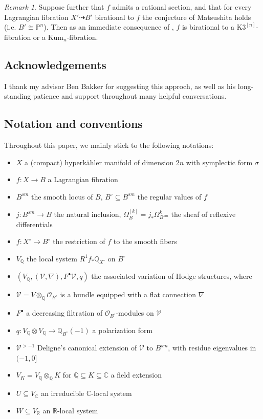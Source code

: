 \documentclass[12pt]{amsart}
\newcommand{\R}{\mathbb{R}}
\newcommand{\Q}{\mathbb{Q}}
\newcommand{\C}{\mathbb{C}}
\theoremstyle{definition}
\theoremstyle{remark}
\newtheorem{remark}[theorem]{Remark}
\numberwithin{equation}{section}
\begin{document}
\begin{remark}
Suppose further that \(f\) admits a rational section, and that for
every Lagrangian fibration \(X' \dashrightarrow B'\) birational to \(f\)
the conjecture of Matsushita holds (i.e. \(B' \cong \mathbb{P}^n\)). Then
as an immediate consequence of \cite[Theorem 1.8]{kim-laza-martin23},
\(f\) is birational to a \(\text{K3}^{[n]}\)-fibration or a 
\(\text{Kum}_n\)-fibration.
\end{remark}


\subsection*{Acknowledgements}
I thank my advisor Ben Bakker for suggesting this approch, as well as his 
long-standing patience and support throughout many helpful conversations. 


\subsection*{Notation and conventions}
Throughout this paper, we mainly stick to the following notations:
\begin{itemize}
\item \(X\) a (compact) hyperk\"ahler manifold of dimension \(2n\) with symplectic
form \(\sigma\)
\item \(f: X \to B\) a Lagrangian fibration
\item \(B^{sm}\) the smooth locus of \(B\), \(B^\circ \subseteq B^{sm}\) the 
regular values of \(f\)
\item \(j: B^{sm} \to B\) the natural inclusion, 
\(\Omega_B^{[k]} = j_* \Omega_{B^{sm}}^k\) the sheaf of reflexive differentials
\item \(f: X^\circ \to B^\circ\) the restriction of \(f\) to the smooth fibers
\item \(V_\Q\) the local system \(R^1 f_* \Q_{X^\circ}\) on \(B^\circ\)
\item \((V_\Q, (\mathcal{V}, \nabla), F^\bullet \mathcal{V}, q)\) the associated 
variation of Hodge structures, where
\item \(\mathcal{V} = V \otimes_\Q \mathcal{O}_{B^{\circ}}\) is a bundle equipped 
with a flat connection \(\nabla\)
\item \(F^\bullet\) a decreasing filtration of \(\mathcal{O}_{B^\circ}\)-modules on
\(\mathcal{V}\)
\item \(q: V_\Q \otimes V_\Q \to \Q_{B^\circ}(-1)\) a polarization form
\item \(\mathcal{V}^{>-1}\) Deligne's canonical extension of \(\mathcal{V}\) 
to \(B^{sm}\), with residue eigenvalues in \((-1, 0]\)
\item \(V_K = V_\Q \otimes_\Q K\) for \(\Q \subseteq K \subseteq \C\) a field 
extension
\item \(U \subseteq V_\C\) an irreducible \(\C\)-local system
\item \(W \subseteq V_\R\) an \(\R\)-local system
\end{itemize}
\end{document}
